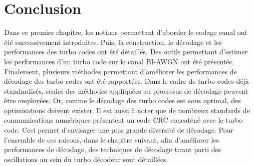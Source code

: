 \section{Conclusion}
Dans ce premier chapitre, les notions permettant d'aborder le codage canal ont été successivement introduites. Puis, la 
construction, le décodage et les performances des turbo codes ont été détaillés. Des outils permettant d'estimer les 
performances d'un turbo code sur le canal BI-AWGN ont été présentés. Finalement, plusieurs méthodes permettant d'améliorer 
les performances de décodage des turbo codes ont été rapportées. Dans le cadre de turbo codes déjà standardisés, seules 
des méthodes appliquées au processus de décodage peuvent être employées. Or, comme le décodage des turbo codes est sous 
optimal, des optimisations doivent exister. Il est aussi à noter que de nombreux standards de communications numériques 
présentent un code CRC concaténé avec le turbo code. Ceci permet d'envisager une plus grande diversité de décodage. Pour 
l'ensemble de ces raisons, dans le chapitre suivant, afin d'améliorer les performances de décodage, des techniques de 
décodage tirant parti des oscillations au sein du turbo décodeur sont détaillées. 